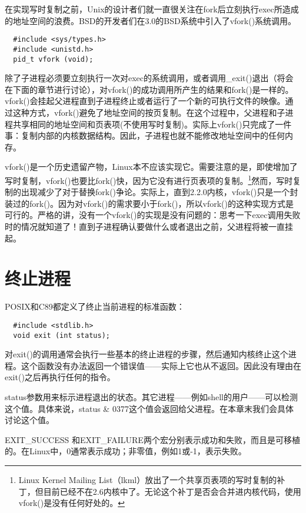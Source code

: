 在实现写时复制之前，Unix的设计者们就一直很关注在fork后立刻执行exec所造成的地址空间的浪费。BSD的开发者们在3.0的BSD系统中引入了vfork()系统调用。

\begin{lstlisting}
  #include <sys/types.h>
  #include <unistd.h>
  pid_t vfork (void);
\end{lstlisting}

除了子进程必须要立刻执行一次对exec的系统调用，或者调用\_exit()退出（将会在下面的章节进行讨论），对vfork()的成功调用所产生的结果和fork()是一样的。vfork()会挂起父进程直到子进程终止或者运行了一个新的可执行文件的映像。通过这种方式，vfork()避免了地址空间的按页复制。在这个过程中，父进程和子进程共享相同的地址空间和页表项(不使用写时复制)。实际上vfork()只完成了一件事：复制内部的内核数据结构。因此，子进程也就不能修改地址空间中的任何内存。

vfork()是一个历史遗留产物，Linux本不应该实现它。需要注意的是，即使增加了写时复制，vfork()也要比fork()快，因为它没有进行页表项的复制。\footnote[1]{Linux Kernel Mailing List（lkml）放出了一个共享页表项的写时复制的补丁，但目前已经不在2.6内核中了。无论这个补丁是否会合并进内核代码，使用vfork()是没有任何好处的。 }然而，写时复制的出现减少了对于替换fork()争论。实际上，直到2.2.0内核，vfork()只是一个封装过的fork()。因为对vfork()的需求要小于fork()，所以vfork()的这种实现方式是可行的。严格的讲，没有一个vfork()的实现是没有问题的：思考一下exec调用失败时的情况就知道了！直到子进程确认要做什么或者退出之前，父进程将被一直挂起。

\section{终止进程}

POSIX和C89都定义了终止当前进程的标准函数：

\begin{lstlisting}
  #include <stdlib.h>
  void exit (int status);
\end{lstlisting}

对exit()的调用通常会执行一些基本的终止进程的步骤，然后通知内核终止这个进程。这个函数没有办法返回一个错误值——实际上它也从不返回。因此没有理由在exit()之后再执行任何的指令。

status参数用来标示进程退出的状态。其它进程——例如shell的用户——可以检测这个值。具体来说，status \& 0377这个值会返回给父进程。在本章末我们会具体讨论这个值。

EXIT\_SUCCESS 和EXIT\_FAILURE两个宏分别表示成功和失败，而且是可移植的。在Linux中，0通常表示成功；非零值，例如1或-1，表示失败。

